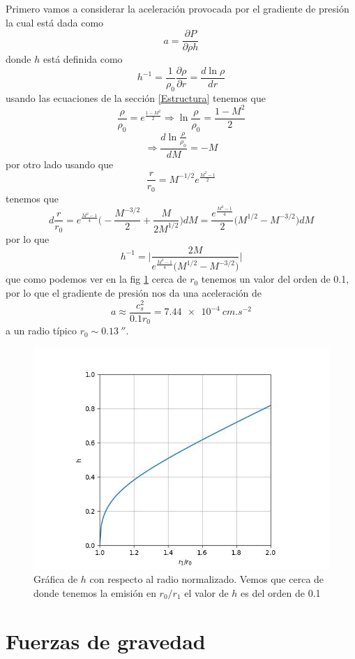 \documentclass{book}
\begin{document}
Primero vamos a considerar la aceleración provocada por el gradiente de presión la cual está dada como \[a = \frac{\partial P}{\partial\rho h}\] donde $h$ está definida como \[h^{-1}=\frac{1}{\rho_0}\frac{\partial\rho}{\partial r}=\frac{d \ln \rho}{dr}\]
usando las ecuaciones de la sección \ref{Estructura} tenemos que \[\frac{\rho}{\rho_0}=e^{\frac{1-M^2}{2}}\Rightarrow\ln\frac{\rho}{\rho_0}=\frac{1-M^2}{2}\]\[\Rightarrow\frac{d\ln\frac{\rho}{\rho_0}}{dM}=-M\] por otro lado usando que \[\frac{r}{r_0}=M^{-1/2}e^{\frac{M^2-1}{2}}\] tenemos que \[d\frac{r}{r_0}=e^{\frac{M^2-1}{4}}\Big(-\frac{M^{-3/2}}{2}+\frac{M}{2M^{1/2}}\Big)dM = \frac{e^{\frac{M^2-1}{4}}}{2}\Big(M^{1/2}-M^{-3/2}\Big)dM\] por lo que \[h^{-1}=\Big|\frac{2M}{e^{\frac{M^2-1}{4}}\Big(M^{1/2}-M^{-3/2}\Big)}\Big|\] que como podemos ver en la fig \ref{fig:h} cerca de $r_0$ tenemos un valor del orden de 0.1, por lo que el gradiente de presión nos da una aceleración de \[a \approx \frac{c_s^2}{0.1 r_0} = \SI{7.44e-4}{cm.s^{-2}}\] a un radio típico $r_0\sim \SI{0.13}{\arcsecond}$.

\begin{figure}
    \centering
    \includegraphics{Appendices/h_3.jpg}
    \caption{Gráfica de $h$ con respecto al radio normalizado. Vemos que cerca de donde tenemos la emisión en $r_0/r_1$ el valor de $h$ es del orden de 0.1}
    \label{fig:h}
\end{figure}

\section{Fuerzas de gravedad} \label{F gravedad}
\end{document}
